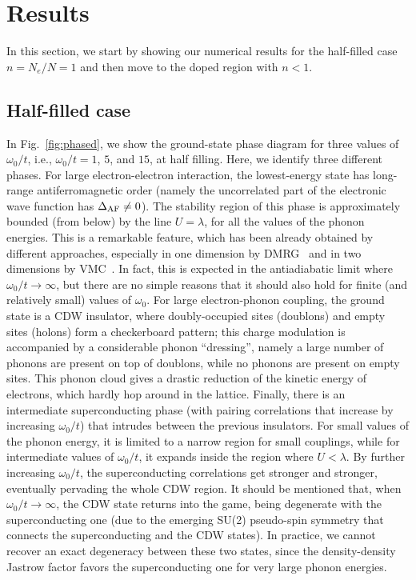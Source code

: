 \documentclass[aps,superscriptaddress,amsmath,amssymb,twocolumn,showpacs,floatfix,english]{revtex4}
\begin{document}
\section{Results}\label{sec:results}

In this section, we start by showing our numerical results for the half-filled case $n=N_e/N=1$ and then move to the doped region with 
$n<1$. 

\subsection{Half-filled case}

In Fig.~\ref{fig:phased}, we show the ground-state phase diagram for three values of $\omega_0/t$, i.e., $\omega_0/t=1$, $5$, and $15$, 
at half filling. Here, we identify three different phases. For large electron-electron interaction, the lowest-energy state has 
long-range antiferromagnetic order (namely the uncorrelated part of the electronic wave function has $\Delta_{\rm AF} \ne 0$). The 
stability region of this phase is approximately bounded (from below) by the line $U=\lambda$, for all the values of the phonon 
energies. This is a remarkable feature, which has been already obtained by different approaches, especially in one dimension by 
DMRG~\cite{Clay2005,Tezuka2007,Fehske2008} and in two dimensions by VMC~\cite{Ohgoe2017}. In fact, this is expected in the antiadiabatic
limit where $\omega_0/t \to \infty$, but there are no simple reasons that it should also hold for finite (and relatively small) values
of $\omega_0$. For large electron-phonon coupling, the ground state is a CDW insulator, where doubly-occupied sites (doublons) and empty 
sites (holons) form a checkerboard pattern; this charge modulation is accompanied by a considerable phonon ``dressing'', namely a large 
number of phonons are present on top of doublons, while no phonons are present on empty sites. This phonon cloud gives a drastic reduction 
of the kinetic energy of electrons, which hardly hop around in the lattice. Finally, there is an intermediate superconducting phase (with 
pairing correlations that increase by increasing $\omega_0/t$) that intrudes between the previous insulators. For small values of the 
phonon energy, it is limited to a narrow region for small couplings, while for intermediate values of $\omega_0/t$, it expands inside the 
region where $U<\lambda$. By further increasing $\omega_0/t$, the superconducting correlations get stronger and stronger, eventually 
pervading the whole CDW region. It should be mentioned that, when $\omega_0/t \to \infty$, the CDW state returns into the game, being 
degenerate with the superconducting one (due to the emerging SU(2) pseudo-spin symmetry that connects the superconducting and the CDW 
states). In practice, we cannot recover an exact degeneracy between these two states, since the density-density Jastrow factor favors the 
superconducting one for very large phonon energies.
\end{document}
